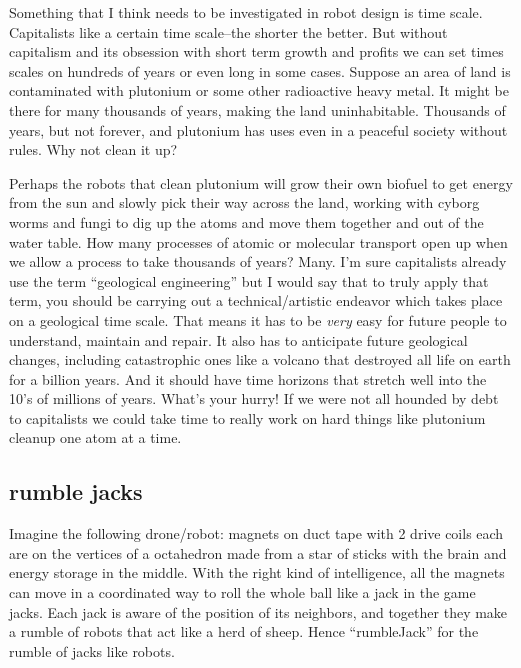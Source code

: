 Something that I think needs to be investigated in robot design is time
scale. Capitalists like a certain time scale--the shorter the better.
But without capitalism and its obsession with short term growth and
profits we can set times scales on hundreds of years or even long in
some cases. Suppose an area of land is contaminated with plutonium or
some other radioactive heavy metal. It might be there for many thousands
of years, making the land uninhabitable. Thousands of years, but not
forever, and plutonium has uses even in a peaceful society without
rules. Why not clean it up?

Perhaps the robots that clean plutonium will grow their own biofuel to
get energy from the sun and slowly pick their way across the land,
working with cyborg worms and fungi to dig up the atoms and move them
together and out of the water table. How many processes of atomic or
molecular transport open up when we allow a process to take thousands of
years? Many. I'm sure capitalists already use the term ``geological
engineering'' but I would say that to truly apply that term, you should
be carrying out a technical/artistic endeavor which takes place on a
geological time scale. That means it has to be \emph{very} easy for
future people to understand, maintain and repair. It also has to
anticipate future geological changes, including catastrophic ones like a
volcano that destroyed all life on earth for a billion years. And it
should have time horizons that stretch well into the 10's of millions of
years. What's your hurry! If we were not all hounded by debt to
capitalists we could take time to really work on hard things like
plutonium cleanup one atom at a time.

\subsection{rumble jacks}\label{rumble-jacks}

Imagine the following drone/robot: magnets on duct tape with 2 drive
coils each are on the vertices of a octahedron made from a star of
sticks with the brain and energy storage in the middle. With the right
kind of intelligence, all the magnets can move in a coordinated way to
roll the whole ball like a jack in the game jacks. Each jack is aware of
the position of its neighbors, and together they make a rumble of robots
that act like a herd of sheep. Hence ``rumbleJack'' for the rumble of
jacks like robots.

